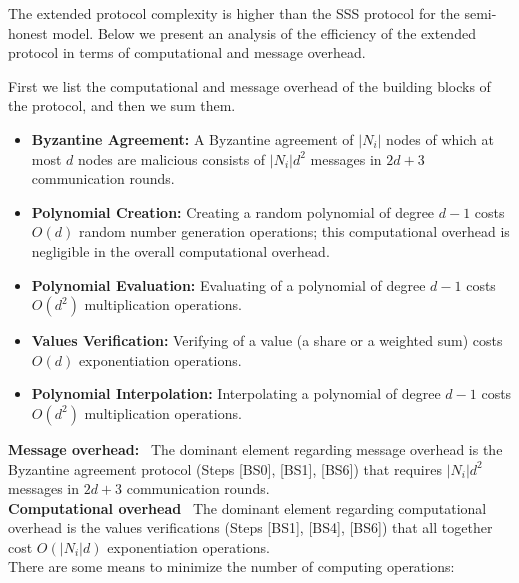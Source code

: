 \documentclass[10pt]{svjour3}
\begin{document}
The extended protocol complexity is higher than the SSS protocol
for the semi-honest model. Below we present an
analysis of the efficiency of the extended protocol in terms of
computational and message overhead.

First we list the computational and message overhead of the
building blocks of the protocol, and then we sum them.

\begin{itemize}
\item \textbf{Byzantine Agreement:} A Byzantine agreement of
$|N_i|$ nodes of which at most $d$ nodes are malicious consists of
$|N_i|d^2$ messages in $2d+3$ communication rounds.

\item \textbf{Polynomial Creation:} Creating a random polynomial
of degree $d-1$ costs $O(d)$ random number generation operations;
this computational overhead is negligible in the overall
computational overhead.

\item \textbf{Polynomial Evaluation:} Evaluating of a polynomial
of degree $d-1$ costs $O(d^2)$ multiplication operations.

\item \textbf{Values Verification:} Verifying of a value (a share
or a weighted sum) costs $O(d)$ exponentiation operations.

\item \textbf{Polynomial Interpolation:} Interpolating a polynomial of
  degree $d-1$ costs $O(d^2)$ multiplication operations.


\end{itemize}


\noindent \textbf{Message overhead:}~ The dominant element
regarding message overhead is the Byzantine agreement protocol
(Steps [BS0], [BS1], [BS6])
that requires $|N_i|d^2$ messages in
$2d+3$
communication rounds.\\


\noindent \textbf{Computational overhead}~ The dominant element
regarding computational overhead is the values verifications
(Steps [BS1],
[BS4], [BS6])
that all together cost $O(|N_i|d)$ exponentiation operations.\\








There are some means to minimize the number of computing
operations:
\end{document}
